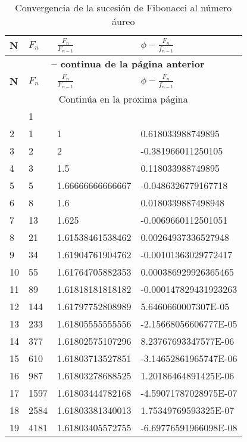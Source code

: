 \begin{longtable}{llll}
	\caption{Convergencia de la sucesión de Fibonacci al número áureo }
	\label{tab:w1wwwww}\\
	\toprule
	\textbf{N} & \textbf{$F_n$} & \textbf{$\frac{F_n}{F_{n-1}}$}&\textbf{$\phi-\frac{F_n}{f_{n-1}}$}\\\midrule
	\endfirsthead %
 \multicolumn{4}{c}{{\bfseries \tablename\ \thetable{} -- continua de la página anterior}} \\
	\toprule
	\textbf{N} & \textbf{$F_n$} & \textbf{$\frac{F_n}{F_{n-1}}$}&\textbf{$\phi-\frac{F_n}{f_{n-1}}$}\\\midrule
	\endhead
	\midrule\multicolumn{4}{c}{{Continúa en la proxima página}} \\\midrule
	\endfoot
	\bottomrule
	\endlastfoot
1	&	1	&		&		\\
2	&	1	&	1	&	0.618033988749895	\\
3	&	2	&	2	&	-0.381966011250105	\\
4	&	3	&	1.5	&	0.118033988749895	\\
5	&	5	&	1.66666666666667	&	-0.0486326779167718	\\
6	&	8	&	1.6	&	0.0180339887498948	\\
7	&	13	&	1.625	&	-0.0069660112501051	\\
8	&	21	&	1.61538461538462	&	0.00264937336527948	\\
9	&	34	&	1.61904761904762	&	-0.00101363029772417	\\
10	&	55	&	1.61764705882353	&	0.000386929926365465	\\
11	&	89	&	1.61818181818182	&	-0.000147829431923263	\\
12	&	144	&	1.61797752808989	&	5.6460660007307E-05	\\
13	&	233	&	1.61805555555556	&	-2.15668056606777E-05	\\
14	&	377	&	1.61802575107296	&	8.23767693347577E-06	\\
15	&	610	&	1.61803713527851	&	-3.14652861965747E-06	\\
16	&	987	&	1.61803278688525	&	1.20186464891425E-06	\\
17	&	1597	&	1.61803444782168	&	-4.59071787028975E-07	\\
18	&	2584	&	1.61803381340013	&	1.75349769593325E-07	\\
19	&	4181	&	1.61803405572755	&	-6.69776591966098E-08	\\

\end{longtable}
